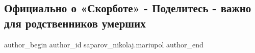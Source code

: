  
 
 
 
 

\subsection{Официально о «Скорботе» - Поделитесь - важно для родственников умерших}
\label{sec:01_06_2022.fb.saparov_nikolaj.mariupol.1.ofitsialno_o__skorbo}

\ifcmt
 author_begin
   author_id saparov_nikolaj.mariupol
 author_end
\fi
